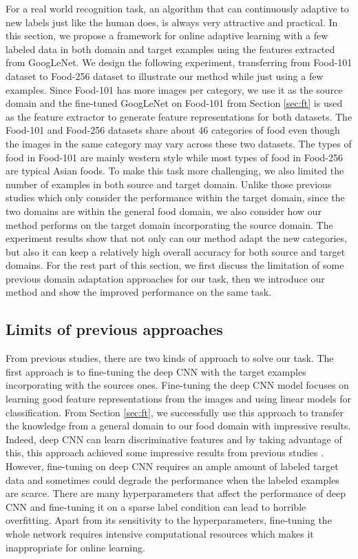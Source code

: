 ﻿For a real world recognition task, an algorithm that can continuously adaptive to new labels just like the human does, is always very attractive and practical.
In this section, we propose a framework for online adaptive learning with a few labeled data in both domain and target examples using the features extracted from GoogLeNet. We design the following experiment, transferring from Food-101 dataset to Food-256 dataset to illustrate our method while just using a few examples. Since Food-101 has more images per category, we use it as the source domain and the fine-tuned GoogLeNet on Food-101 from Section \ref{sec:ft} is used as the feature extractor to generate feature representations for both datasets. The Food-101 and Food-256 datasets share about 46 categories of food even though the images in the same category may vary across these two datasets. The types of food in Food-101 are mainly western style while most types of food in Food-256 are typical Asian foods. To make this task more challenging, we also limited the number of examples in both source and target domain. Unlike those previous studies which only consider the performance within the target domain, since the two domains are within the general food domain, we also consider how our method performs on the target domain incorporating the source domain. The experiment results show that not only can our method adapt the new categories, but also it can keep a relatively high overall accuracy for both source and target domains.
For the rest part of this section, we first discuss the limitation of some previous domain adaptation approaches for our task, then we introduce our method and show the improved performance on the same task.
\subsection{Limits of previous approaches}
From previous studies, there are two kinds of approach to solve our task. The first approach is to fine-tuning the deep CNN with the target examples incorporating with the sources ones.
Fine-tuning the deep CNN model focuses on learning good feature representations from the images and using linear models for classification. From Section \ref{sec:ft}, we successfully use this approach to transfer the knowledge from a general domain to our food domain with impressive results. Indeed, deep CNN can learn discriminative features and by taking advantage of this, this approach achieved some impressive results from previous studies\cite{Chatfield14} \cite{zeiler2014visualizing}. However, fine-tuning on deep CNN requires an ample amount of labeled target data and sometimes could degrade the performance when the labeled examples are scarce\cite{hoffman2013one}. There are many hyperparameters that affect the performance of deep CNN and fine-tuning it on a sparse label condition can lead to horrible overfitting. Apart from its sensitivity to the hyperparameters, fine-tuning the whole network requires intensive computational resources which makes it inappropriate for online learning.

